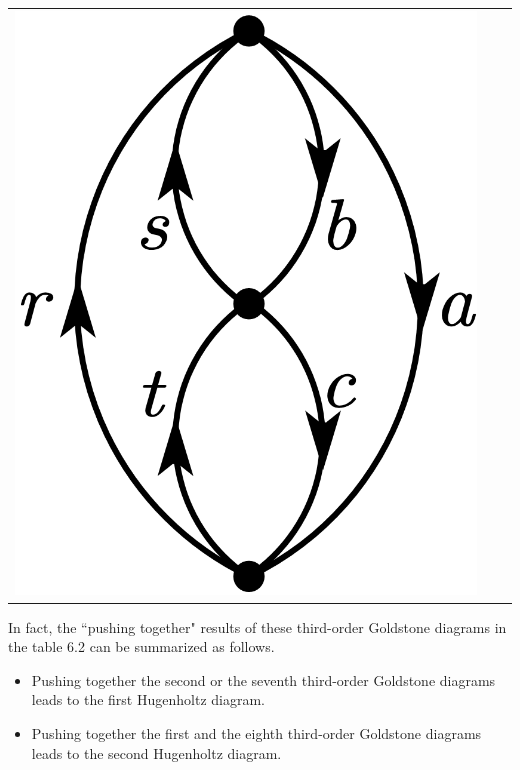 \documentclass[a4paper]{book}
\newcounter{solution}[chapter]
\begin{document}
\begin{solution}
\begin{center}
\begin{tabular}{ccc}
		\begin{minipage}{0.22\linewidth}
		\centering
		\includegraphics[scale=1.0,trim=0 -4 0 -4]{./pictures/6.12/hugenholtz_3.png}
		\end{minipage}
		
	\end{tabular}
	\label{fig:exe12_1}
	\end{center}
	
	In fact, the ``pushing together" results of these third-order Goldstone diagrams in the table 6.2 can be summarized as follows.
	\begin{itemize}
	
	\item Pushing together the second or the seventh third-order Goldstone diagrams leads to the first Hugenholtz diagram.
	
	\item Pushing together the first and the eighth third-order Goldstone diagrams leads to the second Hugenholtz diagram.
	

\end{itemize}
\end{solution}
\end{document}

